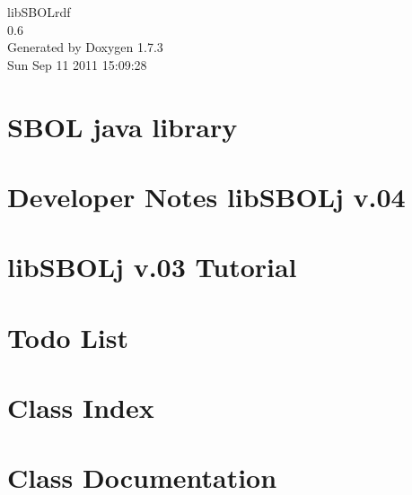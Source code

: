 \documentclass[a4paper]{book}
\begin{document}
\hypersetup{pageanchor=false}
\begin{titlepage}
\vspace*{7cm}
\begin{center}
{\Large libSBOLrdf \\[1ex]\large 0.6 }\\
\vspace*{1cm}
{\large Generated by Doxygen 1.7.3}\\
\vspace*{0.5cm}
{\small Sun Sep 11 2011 15:09:28}\\
\end{center}
\end{titlepage}
\clearemptydoublepage
{}
\tableofcontents
\clearemptydoublepage
{}
\hypersetup{pageanchor=true}
\chapter{SBOL java library}
\label{index}\hypertarget{index}{}
\chapter{Developer Notes libSBOLj v.04}
\label{devnotes}
\hypertarget{devnotes}{}

\chapter{libSBOLj v.03 Tutorial}
\label{tutorial}
\hypertarget{tutorial}{}

\chapter{Todo List}
\label{todo}
\hypertarget{todo}{}

\chapter{Class Index}

\chapter{Class Documentation}







\printindex
\end{document}
